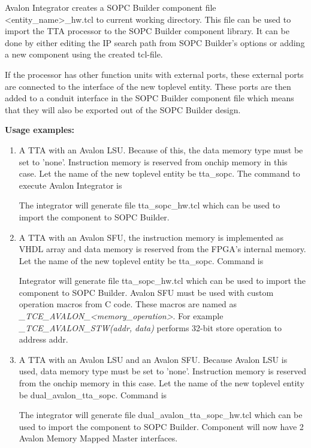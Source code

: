 \documentclass[twoside]{tceusermanual}
\begin{document}
Avalon Integrator creates a SOPC Builder component file <entity\_name>\_hw.tcl
to current working directory. This file can be used to import the TTA processor
to the SOPC Builder component library. It can be done by either editing 
the IP search path from SOPC Builder's options or adding a new component using 
the created tcl-file.

If the processor has other function units with external ports, these external
ports are connected to the interface of the new toplevel entity. These
ports are then added to a conduit interface in the SOPC Builder component
file which means that they will also be exported out of the SOPC Builder
design.

\textbf{Usage examples:}

\begin{enumerate}
 \item A TTA with an Avalon LSU. Because of this, the data memory type
must be set to 'none'. Instruction memory is reserved from onchip memory in this
case. Let the name of the new toplevel entity be tta\_sopc.
The command to execute Avalon Integrator is


The integrator will generate file tta\_sopc\_hw.tcl which can be used to import the
component to SOPC Builder.

\item A TTA with an Avalon SFU, the instruction memory is implemented
as VHDL array and data memory is reserved from the FPGA's internal memory. Let the
name of the new toplevel entity be tta\_sopc. Command is


Integrator will generate file tta\_sopc\_hw.tcl which can be used to import the
component to SOPC Builder. Avalon SFU must be used with custom operation macros
from C code. These macros are named as \textit{\_TCE\_AVALON\_<memory\_operation>}.
For example \textit{\_TCE\_AVALON\_STW(addr, data)} performs 32-bit store operation
to address addr.

\item A TTA with an Avalon LSU and an Avalon SFU. Because Avalon LSU is
used, data memory type must be set to 'none'. Instruction memory is reserved
from the onchip memory in this case. Let the name of the new toplevel entity be
dual\_avalon\_tta\_sopc. Command is


The integrator will generate file dual\_avalon\_tta\_sopc\_hw.tcl which can be
used to import the component to SOPC Builder. Component will now have 2 Avalon
Memory Mapped Master interfaces.

\end{enumerate}
\end{document}

